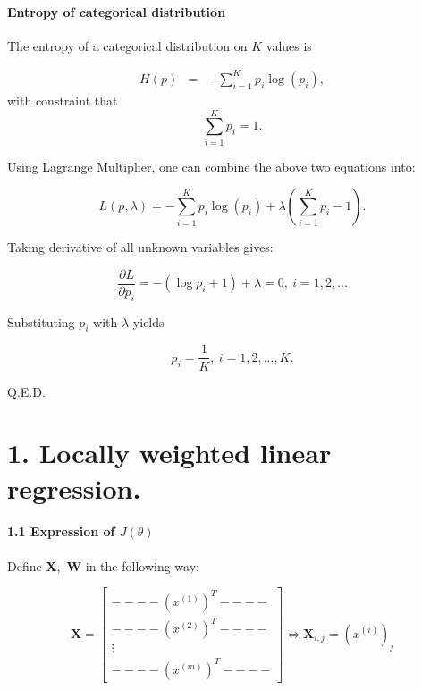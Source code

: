\documentclass[english,11pt]{article}
\begin{document}
\subsection{Entropy of categorical distribution}

The entropy of a categorical distribution on $K$ values is 

\begin{eqnarray}
H(p) & = & -\sum_{i=1}^{K}p_{i}\log(p_{i}),
\end{eqnarray}
with constraint that 
\begin{equation}
\sum_{i=1}^{K}p_{i}=1.    
\end{equation}


Using Lagrange Multiplier, one can combine the above two equations
into:

\begin{equation}
L(p,\lambda)=-\sum_{i=1}^{K}p_{i}\log(p_{i})+\lambda(\sum_{i=1}^{K}p_{i}-1).    
\end{equation}


Taking derivative of all unknown variables gives:

\begin{equation}
\frac{\partial L}{\partial p_{i}}=-(\log p_{i}+1)+\lambda=0,\ i=1,2,...    
\end{equation}


Substituting $p_{i}$ with $\lambda$ yields


\begin{equation}
p_{i}=\frac{1}{K},\ i=1,2,...,K.    
\end{equation}

Q.E.D.





\part*{1. Locally weighted linear regression.}

\subsection*{1.1 Expression of $J(\theta)$}

Define $\boldsymbol{X},$ $\boldsymbol{W}$ in the following way:


\begin{equation}
\boldsymbol{X}=\left[\begin{array}{c}
----\left(x^{(1)}\right)^{T}----\\
----\left(x^{(2)}\right)^{T}----\\
\vdots\\
----\left(x^{(m)}\right)^{T}----
\end{array}\right]\Longleftrightarrow\boldsymbol{X}_{i,j}=(x^{(i)})_{j}    
\end{equation}
\end{document}
